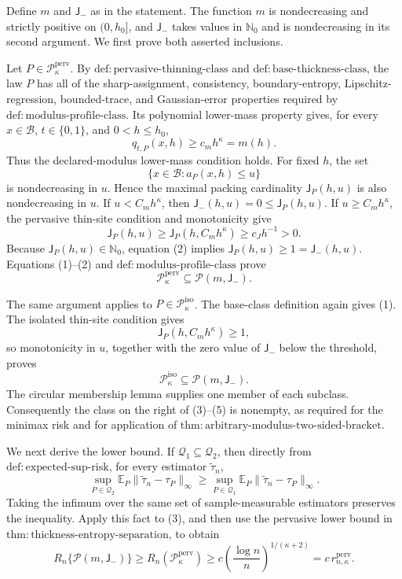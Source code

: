 Define \(m\) and \(\mathsf J_{-}\) as in the statement.  The function \(m\) is nondecreasing and strictly positive on \((0,h_0]\), and \(\mathsf J_{-}\) takes values in \(\mathbb N_0\) and is nondecreasing in its second argument.  We first prove both asserted inclusions.

Let \(P\in\mathcal P_{\kappa}^{\mathrm{perv}}\).  By \(\mathrm{def:pervasive\text{-}thinning\text{-}class}\) and \(\mathrm{def:base\text{-}thickness\text{-}class}\), the law \(P\) has all of the sharp-assignment, consistency, boundary-entropy, Lipschitz-regression, bounded-trace, and Gaussian-error properties required by \(\mathrm{def:modulus\text{-}profile\text{-}class}\).  Its polynomial lower-mass property gives, for every \(x\in\mathcal B\), \(t\in\{0,1\}\), and \(0<h\le h_0\),
\[
 q_{t,P}(x,h)\ge c_mh^\kappa=m(h). \tag{1}
\]
Thus the declared-modulus lower-mass condition holds.  For fixed \(h\), the set
\[
 \{x\in\mathcal B:a_P(x,h)\le u\}
\]
is nondecreasing in \(u\).  Hence the maximal packing cardinality \(\mathsf J_P(h,u)\) is also nondecreasing in \(u\).  If \(u<C_mh^\kappa\), then \(\mathsf J_{-}(h,u)=0\le\mathsf J_P(h,u)\).  If \(u\ge C_mh^\kappa\), the pervasive thin-site condition and monotonicity give
\[
 \mathsf J_P(h,u)
 \ge \mathsf J_P(h,C_mh^\kappa)
 \ge c_Jh^{-1}>0. \tag{2}
\]
Because \(\mathsf J_P(h,u)\in\mathbb N_0\), equation (2) implies \(\mathsf J_P(h,u)\ge1=\mathsf J_{-}(h,u)\).  Equations (1)--(2) and \(\mathrm{def:modulus\text{-}profile\text{-}class}\) prove
\[
 \mathcal P_{\kappa}^{\mathrm{perv}}
 \subseteq\mathcal P(m,\mathsf J_{-}). \tag{3}
\]

The same argument applies to \(P\in\mathcal P_{\kappa}^{\mathrm{iso}}\).  The base-class definition again gives (1).  The isolated thin-site condition gives
\[
 \mathsf J_P(h,C_mh^\kappa)\ge1, \tag{4}
\]
so monotonicity in \(u\), together with the zero value of \(\mathsf J_{-}\) below the threshold, proves
\[
 \mathcal P_{\kappa}^{\mathrm{iso}}
 \subseteq\mathcal P(m,\mathsf J_{-}). \tag{5}
\]
The circular membership lemma supplies one member of each subclass.  Consequently the class on the right of (3)--(5) is nonempty, as required for the minimax risk and for application of \(\mathrm{thm:arbitrary\text{-}modulus\text{-}two\text{-}sided\text{-}bracket}\).

We next derive the lower bound.  If \(\mathcal Q_1\subseteq\mathcal Q_2\), then directly from \(\mathrm{def:expected\text{-}sup\text{-}risk}\), for every estimator \(\widetilde\tau_n\),
\[
 \sup_{P\in\mathcal Q_2}
 \mathbb E_P\|\widetilde\tau_n-\tau_P\|_{\infty}
 \ge
 \sup_{P\in\mathcal Q_1}
 \mathbb E_P\|\widetilde\tau_n-\tau_P\|_{\infty}.
\]
Taking the infimum over the same set of sample-measurable estimators preserves the inequality.  Apply this fact to (3), and then use the pervasive lower bound in \(\mathrm{thm:thickness\text{-}entropy\text{-}separation}\), to obtain
\[
 R_n\{\mathcal P(m,\mathsf J_{-})\}
 \ge R_n(\mathcal P_{\kappa}^{\mathrm{perv}})
 \ge c\left(\frac{\log n}{n}\right)^{1/(\kappa+2)}
 =c\,r_{n,\kappa}^{\mathrm{perv}}. \tag{6}
\]

